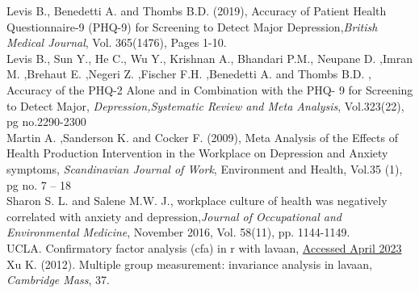 \documentclass[12pt]{article}
\begin{document}
\indent Levis B., Benedetti A. and Thombs B.D. (2019), Accuracy of Patient Health Questionnaire-9 (PHQ-9) for Screening to Detect Major Depression,\emph{British Medical Journal}, Vol. 365(1476), Pages 1-10.\\
\indent Levis B., Sun Y., He C., Wu Y., Krishnan A., Bhandari P.M., Neupane D. ,Imran M. ,Brehaut E. ,Negeri Z. ,Fischer F.H. ,Benedetti A. and Thombs B.D. , Accuracy of the PHQ-2 Alone and in Combination with the PHQ- 9 for Screening to Detect Major, \emph{Depression,Systematic Review and Meta Analysis}, Vol.323(22), pg no.2290-2300\\
\indent Martin A. ,Sanderson K. and Cocker F. (2009), Meta Analysis of the Effects of Health Production Intervention in the Workplace on Depression and Anxiety symptoms, \emph{Scandinavian Journal of Work}, Environment and Health, Vol.35 (1), pg no. 7 – 18\\
\indent Sharon S. L. and Salene M.W. J., workplace culture of health was negatively correlated with anxiety and depression,\emph{Journal of Occupational and Environmental Medicine}, November 2016, Vol. 58(11), pp. 1144-1149.\\
\indent UCLA. Confirmatory factor analysis (cfa) in r with lavaan, 
\href{https://stats.oarc.ucla.edu/r/seminars/rcfa/}{Accessed April 2023} \\
\indent Xu K. (2012). Multiple group measurement: invariance analysis in lavaan, \emph{Cambridge Mass}, 37.\\
\end{document}
